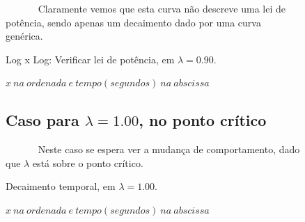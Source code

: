 \documentclass[pdftex,12pt,a4paper]{article}
\begin{document}
\begin{figure}
~~~~~~ Claramente vemos que esta curva não descreve uma lei de potência, sendo apenas um decaimento dado por uma curva genérica.

\centering
\caption{Log x Log: Verificar lei de potência, em $\lambda = 0.90$.}
\caption*{$x\ na\ ordenada\ e\ tempo(segundos)\ na\ abscissa$}
\end{figure}

\begin{figure}
\subsection{Caso para $\lambda = 1.00$, no ponto crítico}
~~~~~~ Neste caso se espera ver a mudança de comportamento, dado que $\lambda$ está sobre o ponto crítico.

\centering
\caption{Decaimento temporal, em $\lambda = 1.00$.}
\caption*{$x\ na\ ordenada\ e\ tempo(segundos)\ na\ abscissa$}
\end{figure}
\end{document}

